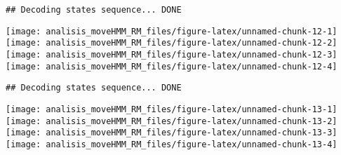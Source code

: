 \documentclass[
]{article}
\newenvironment{Shaded}{\begin{snugshade}}{\end{snugshade}}
\newcommand{\AttributeTok}[1]{\textcolor[rgb]{0.77,0.63,0.00}{#1}}
\newcommand{\ConstantTok}[1]{\textcolor[rgb]{0.00,0.00,0.00}{#1}}
\newcommand{\DecValTok}[1]{\textcolor[rgb]{0.00,0.00,0.81}{#1}}
\newcommand{\FloatTok}[1]{\textcolor[rgb]{0.00,0.00,0.81}{#1}}
\newcommand{\FunctionTok}[1]{\textcolor[rgb]{0.00,0.00,0.00}{#1}}
\newcommand{\NormalTok}[1]{#1}
\newcommand{\SpecialCharTok}[1]{\textcolor[rgb]{0.00,0.00,0.00}{#1}}
\newcommand{\StringTok}[1]{\textcolor[rgb]{0.31,0.60,0.02}{#1}}
\begin{document}
\begin{verbatim}
## Decoding states sequence... DONE
\end{verbatim}

\texttt{[image: analisis\_moveHMM\_RM\_files/figure-latex/unnamed-chunk-12-1]}
\texttt{[image: analisis\_moveHMM\_RM\_files/figure-latex/unnamed-chunk-12-2]}
\texttt{[image: analisis\_moveHMM\_RM\_files/figure-latex/unnamed-chunk-12-3]}
\texttt{[image: analisis\_moveHMM\_RM\_files/figure-latex/unnamed-chunk-12-4]}

\begin{Shaded}
\end{Shaded}

\begin{verbatim}
## Decoding states sequence... DONE
\end{verbatim}

\texttt{[image: analisis\_moveHMM\_RM\_files/figure-latex/unnamed-chunk-13-1]}
\texttt{[image: analisis\_moveHMM\_RM\_files/figure-latex/unnamed-chunk-13-2]}
\texttt{[image: analisis\_moveHMM\_RM\_files/figure-latex/unnamed-chunk-13-3]}
\texttt{[image: analisis\_moveHMM\_RM\_files/figure-latex/unnamed-chunk-13-4]}

\begin{Shaded}
\end{Shaded}
\end{document}
